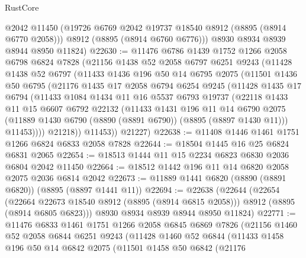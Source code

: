 \begin{lexlean}{RustCore}
\begin{coremodule}
        @2042
        @11450
        (@19726 @6769 @2042 @19737 @18540 @8912 (@8895 (@8914 @6770 @2058)))
        @8912
        (@8895 (@8914 @6760 @6776)))
      @8930
      @8934
      @8939
      @8944
      @8950
      @11824)
@22630 := @11476
    @6786
    @1439
    @1752
    @1266
    @2058
    @6798
    @6824
    @7828
    (@21156
      @1438
      @52
      @2058
      @6797
      @6251
      @9243
      (@11428
        @1438
        @52
        @6797
        (@11433
          @1436
          @196
          @50
          @14
          @6795
          @2075
          (@11501
            @1436
            @50
            @6795
            (@21176
              @1435
              @17
              @2058
              @6794
              @6254
              @9245
              (@11428
                @1435
                @17
                @6794
                (@11433
                  @1084
                  @1434
                  @11
                  @16
                  @5537
                  @6793
                  @19737
                  (@22118
                    @1433
                    @11
                    @15
                    @6607
                    @6792
                    @22132
                    (@11433
                      @1431
                      @196
                      @11
                      @14
                      @6790
                      @2075
                      (@11889 @1430 @6790 (@8890 (@8891 @6790)) (@8895 (@8897 @1430 @11)))
                      @11453))))
              @21218))
          @11453))
      @21227)
@22638 := @11408 @1446 @1461 @1751 @1266 @6824 @6833 @2058 @7828
@22644 := @18504 @1445 @16 @25 @6824 @6831 @2065
@22654 := @18513 @1444 @11 @15 @2234 @6823 @6830 @2036 @6804 @2042 @11450
@22664 := @18512 @1442 @196 @11 @14 @6820 @2058 @2075 @2036 @6814 @2042
@22673 := @11889 @1441 @6820 (@8890 (@8891 @6820)) (@8895 (@8897 @1441 @11))
@22694 := @22638
    (@22644
      (@22654
        (@22664 @22673 @18540 @8912 (@8895 (@8914 @6815 @2058)))
        @8912
        (@8895 (@8914 @6805 @6823)))
      @8930
      @8934
      @8939
      @8944
      @8950
      @11824)
@22771 := @11476
    @6833
    @1461
    @1751
    @1266
    @2058
    @6845
    @6869
    @7826
    (@21156
      @1460
      @52
      @2058
      @6844
      @6251
      @9243
      (@11428
        @1460
        @52
        @6844
        (@11433
          @1458
          @196
          @50
          @14
          @6842
          @2075
          (@11501
            @1458
            @50
            @6842
            (@21176

\end{coremodule}
\end{lexlean}
